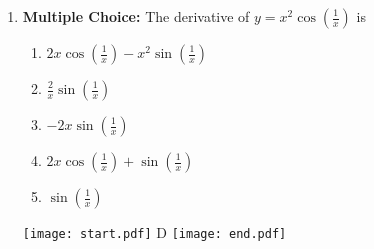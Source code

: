 \documentclass[12pt]{article}
\begin{document}
\begin{enumerate}
\item {\bf Multiple Choice:} The derivative of $y=x^2\cos{\left(\frac{1}{x}\right)}$ is

\begin{enumerate}

\item $2x\cos{\left(\frac{1}{x}\right)}-x^2\sin{\left(\frac{1}{x}\right)}$

\item $\frac{2}{x}\sin{\left(\frac{1}{x}\right)}$

\item $-2x\sin{\left(\frac{1}{x}\right)}$

\item $2x\cos{\left(\frac{1}{x}\right)}+\sin{\left(\frac{1}{x}\right)}$

\item $\sin{\left(\frac{1}{x}\right)}$

\end{enumerate}

\texttt{[image: start.pdf]}
{{D}}
\texttt{[image: end.pdf]}


\end{enumerate}
\end{document}
